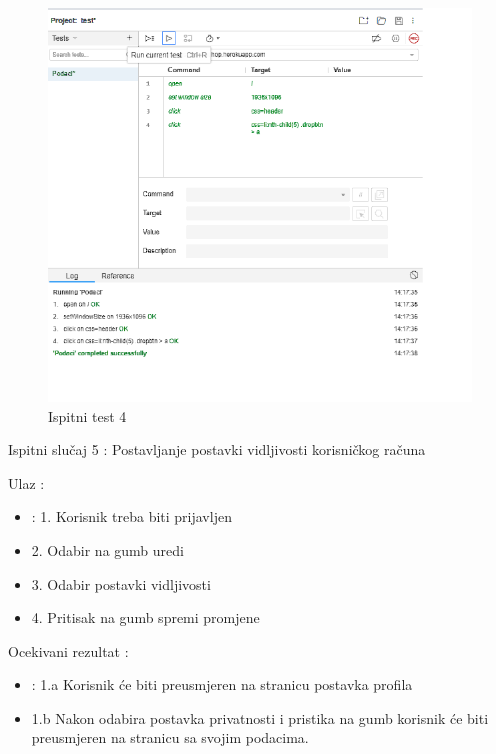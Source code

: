 			\begin{figure}[H]
				\includegraphics[width=1\linewidth]{slike/ispitni_test_4.png} %
				\caption{Ispitni test 4}
				\label{fig:Test4} %
			\end{figure}				

			\noindent Ispitni slučaj 5 : Postavljanje postavki vidljivosti korisničkog računa

			\noindent Ulaz : 
	
			\begin{itemize}
				\item : 1. Korisnik treba biti prijavljen
				\item   2. Odabir na gumb uredi
				\item   3. Odabir postavki vidljivosti
				\item   4. Pritisak na gumb spremi promjene
			\end{itemize}

			\noindent Ocekivani rezultat : 

			\begin{itemize}
				\item : 1.a Korisnik će biti preusmjeren na stranicu postavka profila
				\item   1.b Nakon odabira postavka privatnosti i pristika na gumb korisnik će biti preusmjeren na stranicu sa svojim podacima.
			\end{itemize}
	
